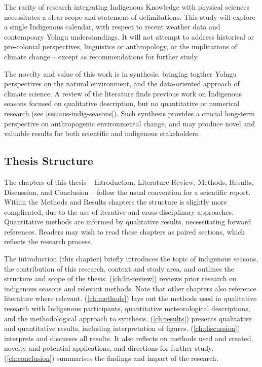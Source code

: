 The rarity of research integrating Indigenous Knowledge with physical sciences
necessitates a clear scope and statement of delimitations.  This study will
explore a single Indigenous calendar, with respect to recent weather data
and contempoary Yolngu understandings.  It will not attempt to address historical
or pre-colonial perspectives, linguistics or anthropology, or the implications
of climate change -- except as recommendations for further study.

The novelty and value of this work is in synthesis: bringing
togther Yolngu perspectives on the natural environment, and the
data-oriented approach of climate science.  A review of the literature
finds previous work on Indigenous seasons focused on qualitative description, but
no quantitative or numerical research (see \cref{sec:aus-indig-seasons}).
Such synthesis provides a crucial long-term perspective on
anthropogenic environmental change, and may produce novel and valuable
results for both scientific and indigenous stakeholders.



\subsection*{Thesis Structure}

The chapters of this thesis -- Introduction, Literature Review, Methods,
Results, Discussion, and Conclusion -- follow the usual convention for
a scientific report.  Within the Methods and Results chapters
the structure is slightly more complicated, due to the use of iterative and
cross-disciplinary approaches.  Quantitative methods are informed by
qualitative results, necessitating forward references.  Readers may wish
to read these chapters as paired sections, which reflects the research
process.

The introduction (this chapter) briefly introduces the topic of
indigenous seasons, the contribution of this research, context and
study area, and outlines the structure and scope of the thesis.
 (\cref{ch:lit-review}) reviews prior research
on indigenous seasons and relevant methods.  Note that other chapters
also reference literature where relevant.
 (\cref{ch:methods}) lays out the methods used in
qualitative research with Indigenous participants, quantitative meteorological
descriptions, and the methodological approach to synthesis.
 (\cref{ch:results}) presents qualitative and
quantitative results, including interpretation of figures.
 (\cref{ch:discussion}) interprets and discusses
all results.  It also reflects on methods used and created, novelty and
potential applications, and directions for further study.
 (\cref{ch:conclusion}) summarises the findings
and impact of the research.

